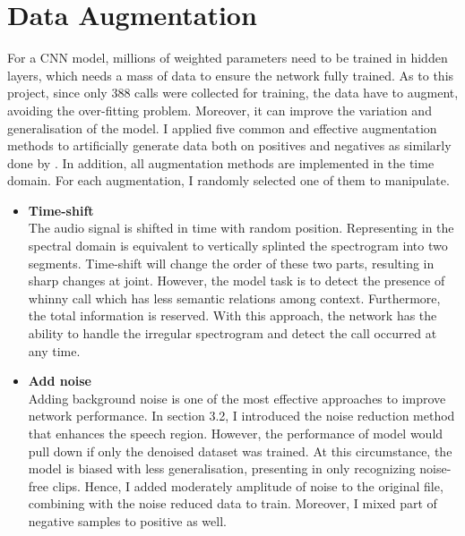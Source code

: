 \section{Data Augmentation}
For a CNN model, millions of weighted parameters need to be trained in hidden layers, which needs a mass of data to ensure the network fully trained. As to this project, since only 388 calls were collected for training, the data have to augment, avoiding the over-fitting problem. Moreover, it can improve the variation and generalisation of the model. I applied five common and effective augmentation methods to artificially generate data both on positives and negatives as similarly done by \cite{sprengel2016audio}. In addition, all augmentation methods are implemented in the time domain. For each augmentation, I randomly selected one of them to manipulate.
\begin{itemize}[leftmargin=*]
\item \textbf{Time-shift}\\
The audio signal is shifted in time with random position. Representing in the spectral domain is equivalent to vertically splinted the spectrogram into two segments. Time-shift will change the order of these two parts, resulting in sharp changes at joint. However, the model task is to detect the presence of whinny call which has less semantic relations among context. Furthermore, the total information is reserved. With this approach, the network has the ability to handle the irregular spectrogram and detect the call occurred at any time.
\item \textbf{Add noise}\\
Adding background noise is one of the most effective approaches to improve network performance. In section 3.2, I introduced the noise reduction method that enhances the speech region. However, the performance of model would pull down if only the denoised dataset was trained. At this circumstance, the model is biased with less generalisation, presenting in only recognizing noise-free clips. Hence, I added moderately amplitude of noise to the original file, combining with the noise reduced data to train. Moreover, I mixed part of negative samples to positive as well. 


\end{itemize}
